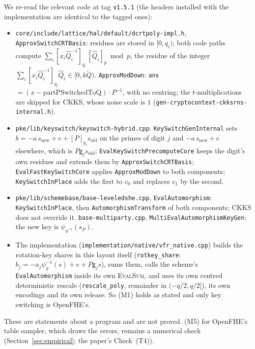 \begin{remark}\label{rem:ofhecode}
We re-read the relevant code at tag \texttt{v1.5.1} (the headers installed with the implementation are identical to the tagged ones):
\begin{itemize}[nosep]
  \item \texttt{core/include/lattice/hal/default/dcrtpoly-impl.h}, \texttt{ApproxSwitchCRTBasis}: residues are stored in $[0,q_i)$; both code paths compute $\sum_{i}[x_i\hat Q_i^{-1}]_{q_i}\,[\hat Q_i]_{p}\bmod p$, the residue of the integer $\sum_i[x_i\hat Q_i^{-1}]_{q_i}\hat Q_i\in[0,k\tilde Q)$. \texttt{ApproxModDown}: \texttt{ans} $=(x-\mathrm{partPSwitchedToQ})\cdot P^{-1}$, with no centring; the $t$-multiplications are skipped for CKKS, whose noise scale is $1$ (\texttt{gen-cryptocontext-ckksrns-internal.h}).
  \item \texttt{pke/lib/keyswitch/keyswitch-hybrid.cpp}: \texttt{KeySwitchGenInternal} sets $b=-a\,s_{\mathrm{new}}+e+[P]_{q_i}s_{\mathrm{old}}$ on the primes of digit $j$ and $-a\,s_{\mathrm{new}}+e$ elsewhere, which is $P\mathsf g_js_{\mathrm{old}}$; \texttt{EvalKeySwitchPrecomputeCore} keeps the digit's own residues and extends them by \texttt{ApproxSwitchCRTBasis}; \texttt{EvalFastKeySwitchCore} applies \texttt{ApproxModDown} to both components; \texttt{KeySwitchInPlace} adds the first to $c_0$ and replaces $c_1$ by the second.
  \item \texttt{pke/lib/schemebase/base-leveledshe.cpp}, \texttt{EvalAutomorphism}: \texttt{KeySwitchInPlace}, then \texttt{AutomorphismTransform} of both components; CKKS does not override it. \texttt{base-multiparty.cpp}, \texttt{MultiEvalAutomorphismKeyGen}: the new key is $\psi_{g^{-1}}(s_P)$.
  \item The implementation (\texttt{implementation/native/vfr\_native.cpp}) builds the rotation-key shares in this layout itself (\texttt{rotkey\_share}: $b_j=-a_j\psi_g^{-1}(s)+e+P\mathsf g_js$), sums them, calls the scheme's \texttt{EvalAutomorphism} inside its own \textsc{EvalSum}, and uses its own centred deterministic rescale (\texttt{rescale\_poly}, remainder in $(-q/2,q/2]$), its own encodings and its own release. So (M1) holds as stated and only key switching is OpenFHE's.
\end{itemize}
These are statements about a program and are not proved. (M5) for OpenFHE's table sampler, which draws the errors, remains a numerical check (Section~\ref{sec:empirical}; the paper's Check~(T4)).
\end{remark}

